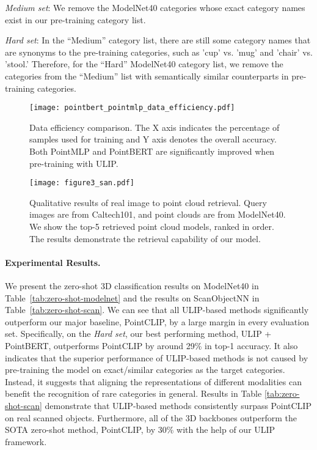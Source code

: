 \documentclass[10pt,twocolumn,letterpaper]{article}
\begin{document}
\noindent\textit{Medium set}: We remove the ModelNet40 categories whose exact category names exist in our pre-training category list.

\noindent\textit{Hard set}: In the ``Medium'' category list, there are still some category names that are synonyms to the pre-training categories, 
such as 'cup' vs. 'mug' and 'chair' vs. 'stool.' Therefore, for the ``Hard'' ModelNet40 category list, we remove the categories from the ``Medium'' list with semantically similar counterparts in pre-training categories. 


\begin{figure}[htb]
    \centering
    \texttt{[image: pointbert\_pointmlp\_data\_efficiency.pdf]}
\caption{Data efficiency comparison. The X axis indicates the percentage of samples used for training and Y axis denotes the overall accuracy. Both PointMLP and PointBERT are significantly improved when pre-training with ULIP. }
    \label{fig:data-efficiency}
\end{figure}
\begin{figure*}[htb]
    \centering
    \texttt{[image: figure3\_san.pdf]}
\caption{Qualitative results of real image to point cloud retrieval. Query images are from Caltech101, and point clouds are from ModelNet40. We show the top-5 retrieved point cloud models, ranked in order. The results demonstrate the retrieval capability of our model.}
    \label{fig:image_pc_retrieval}
\end{figure*}
\paragraph{Experimental Results.}
We present the zero-shot 3D classification results on ModelNet40 in Table~\ref{tab:zero-shot-modelnet} and the results on ScanObjectNN in Table~\ref{tab:zero-shot-scan}. We can see that all ULIP-based methods significantly outperform our major baseline, PointCLIP, by a large margin in every evaluation set.
Specifically, on the \emph{Hard set}, our best performing method, ULIP + PointBERT, outperforms PointCLIP by around 29\% in top-1 accuracy. It also indicates that the superior performance of ULIP-based methods is not caused by pre-training the model on exact/similar categories as the target categories.
Instead, it suggests that aligning the representations of different modalities can benefit the recognition of rare categories in general. Results in Table \ref{tab:zero-shot-scan} demonstrate that ULIP-based methods consistently surpass PointCLIP on real scanned objects. Furthermore, all of the 3D backbones outperform the SOTA zero-shot method, PointCLIP, by 30\% with the help of our ULIP framework.
\end{document}
